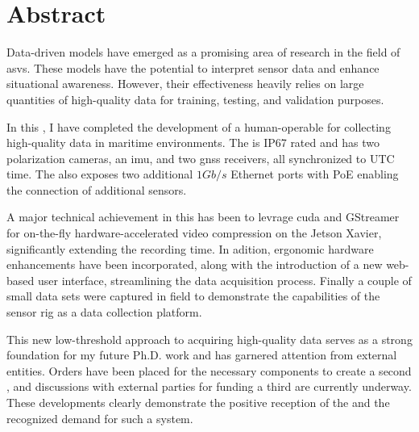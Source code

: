 \chapter*{Abstract}

Data-driven models have emerged as a promising area of research in the field of \glspl{asv}.
These models have the potential to interpret sensor data and enhance situational awareness.
However, their effectiveness heavily relies on large quantities of high-quality data for training, testing, and validation purposes.

In this \master, I have completed the development of a human-operable \sr for collecting high-quality data in maritime environments.
The \sr is IP67 rated and has two polarization cameras, an \gls{imu}, and two \gls{gnss} receivers, all synchronized to UTC time.
The \sr also exposes two additional $1Gb/s$ Ethernet ports with PoE  enabling the connection of additional sensors.

A major technical achievement in this \master has been to levrage \gls{cuda} and GStreamer for on-the-fly hardware-accelerated video compression on the Jetson Xavier, significantly extending the recording time.
In adition, ergonomic hardware enhancements have been incorporated, along with the introduction of a new web-based user interface, streamlining the data acquisition process.
Finally a couple of small data sets were captured in field to demonstrate the capabilities of the sensor rig as a data collection platform.

This new low-threshold approach to acquiring high-quality data serves as a strong foundation for my future Ph.D. work and has garnered attention from external entities. Orders have been placed for the necessary components to create a second \sr, and discussions with external parties for funding a third \sr are currently underway. These developments clearly demonstrate the positive reception of the \sr and the recognized demand for such a system.

